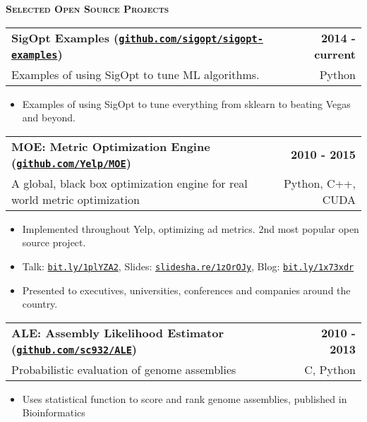\documentclass[letterpaper, 11pt]{article}
\makeatletter
\renewcommand{\section}[1]{%
  \begin{tcolorbox}
    \textsc{\textbf{\large{#1}}}
  \end{tcolorbox}
}
\newcommand{\entry}[4]{%
  \begin{tabularx}{\linewidth}{@{}Xr@{}}
    \textbf{#1} & \textbf{#4} \\
    #3          & #2          \\
  \end{tabularx}
}
\newcommand{\website}[1]{\href{http://#1}{\texttt{#1}}}
\makeatother
\begin{document}
  \section{Selected Open Source Projects}
  
  \entry{SigOpt Examples (\website{github.com/sigopt/sigopt-examples})}{Python}{Examples of using SigOpt to tune ML algorithms.}{2014 - current}
  \begin{itemize}
    \item{Examples of using SigOpt to tune everything from sklearn to beating Vegas and beyond.}
  \end{itemize}

  \entry{MOE: Metric Optimization Engine (\website{github.com/Yelp/MOE})}{Python, C++, CUDA}{A global, black box optimization engine for real world metric optimization}{2010 - 2015}
  \begin{itemize}
    \item{Implemented throughout Yelp, optimizing ad metrics. 2nd most popular open source project.}
    \item{Talk: \website{bit.ly/1plYZA2}, Slides: \website{slidesha.re/1zOrOJy}, Blog: \website{bit.ly/1x73xdr}}
    \item{Presented to executives, universities, conferences and companies around the country.}
  \end{itemize}

  \entry{ALE: Assembly Likelihood Estimator (\website{github.com/sc932/ALE})}{C, Python}{Probabilistic evaluation of genome assemblies}{2010 - 2013}
  \begin{itemize}
    \item{Uses statistical function to score and rank genome assemblies, published in Bioinformatics}
  \end{itemize}
\end{document}
